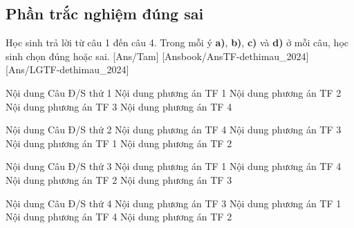 \documentclass[FileMain.tex]{subfiles}
\begin{document}
\subsection{Phần trắc nghiệm đúng sai}
Học sinh trả lời từ câu 1 đến câu 4. Trong mỗi ý \textbf{a)}, \textbf{b)}, \textbf{c)} và \textbf{d)} ở mỗi câu, học sinh chọn đúng hoặc sai.
[Ans/Tam]
[Ansbook/AnsTF-dethimau_2024]
[Ans/LGTF-dethimau_2024]
\luulgEXTF
{}
\begin{ex}
	Nội dung Câu Đ/S thứ 1
	\choiceTF
	{\True Nội dung phương án TF 1}
	{Nội dung phương án TF 2}
	{\True Nội dung phương án TF 3}
	{Nội dung phương án TF 4}
	\loigiai{}
\end{ex}
\begin{ex}
	Nội dung Câu Đ/S thứ 2
	\choiceTF
	{\True Nội dung phương án TF 4}
	{Nội dung phương án TF 3}
	{\True Nội dung phương án TF 1}
	{Nội dung phương án TF 2}
	\loigiai{}
\end{ex}
\begin{ex}
	Nội dung Câu Đ/S thứ 3
	\choiceTF
	{\True Nội dung phương án TF 1}
	{\True Nội dung phương án TF 4}
	{\True Nội dung phương án TF 2}
	{Nội dung phương án TF 3}
	\loigiai{}
\end{ex}
\begin{ex}
	Nội dung Câu Đ/S thứ 4
	\choiceTF
	{Nội dung phương án TF 3}
	{\True Nội dung phương án TF 1}
	{Nội dung phương án TF 4}
	{Nội dung phương án TF 2}
	\loigiai{}
\end{ex}
\end{document}
